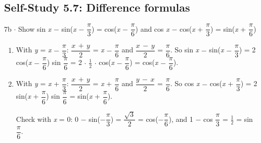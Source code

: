 \documentclass[11pt]{article}
\begin{document}
\begin{keepsection}\subsection{Self-Study 5.7: Difference formulas}

\begin{workedbox}{7b \ensuremath{\cdot} Show sin \textit{x} \ensuremath{-} sin(\textit{x} \ensuremath{-} {\small\ensuremath{\dfrac{π}{3}}}) = cos(\textit{x} \ensuremath{-} {\small\ensuremath{\dfrac{π}{6}}}) and cos \textit{x} \ensuremath{-} cos(\textit{x} + {\small\ensuremath{\dfrac{π}{3}}}) = sin(\textit{x} + {\small\ensuremath{\dfrac{π}{6}}})}
\begin{enumerate}
\item With \textit{y} = \textit{x} \ensuremath{-} {\small\ensuremath{\dfrac{π}{3}}}: {\small\ensuremath{\dfrac{{x}\, +\, {y}}{2}}} = \textit{x} \ensuremath{-} {\small\ensuremath{\dfrac{π}{6}}} and {\small\ensuremath{\dfrac{{x}\, -\, {y}}{2}}} = {\small\ensuremath{\dfrac{π}{6}}}. So sin \textit{x} \ensuremath{-} sin(\textit{x} \ensuremath{-} {\small\ensuremath{\dfrac{π}{3}}}) = 2 cos(\textit{x} \ensuremath{-} {\small\ensuremath{\dfrac{π}{6}}}) sin {\small\ensuremath{\dfrac{π}{6}}} = 2 \ensuremath{\cdot} \ensuremath{\tfrac12} \ensuremath{\cdot} cos(\textit{x} \ensuremath{-} {\small\ensuremath{\dfrac{π}{6}}}) = cos(\textit{x} \ensuremath{-} {\small\ensuremath{\dfrac{π}{6}}}).
\item {}
With \textit{y} = \textit{x} + {\small\ensuremath{\dfrac{π}{3}}}: {\small\ensuremath{\dfrac{{x}\, +\, {y}}{2}}} = \textit{x} + {\small\ensuremath{\dfrac{π}{6}}} and {\small\ensuremath{\dfrac{{y}\, -\, {x}}{2}}} = {\small\ensuremath{\dfrac{π}{6}}}. So cos \textit{x} \ensuremath{-} cos(\textit{x} + {\small\ensuremath{\dfrac{π}{3}}}) = 2 sin(\textit{x} + {\small\ensuremath{\dfrac{π}{6}}}) sin {\small\ensuremath{\dfrac{π}{6}}} = sin(\textit{x} + {\small\ensuremath{\dfrac{π}{6}}}).

Check with \textit{x} = 0: 0 \ensuremath{-} sin(\ensuremath{-}{\small\ensuremath{\dfrac{π}{3}}}) = {\small\ensuremath{\dfrac{\sqrt{3}}{2}}} = cos(\ensuremath{-}{\small\ensuremath{\dfrac{π}{6}}}), and 1 \ensuremath{-} cos {\small\ensuremath{\dfrac{π}{3}}} = \ensuremath{\tfrac12} = sin {\small\ensuremath{\dfrac{π}{6}}}.
\end{enumerate}
\end{workedbox}

\end{keepsection}
\end{document}
